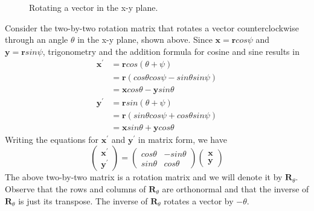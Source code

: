 \documentclass[oneside]{book}
\begin{document}
{{\begin{figure}[H]
\begin{center}
            \end{center}
            \caption{Rotating a vector in the x-y plane.}
        \end{figure}
        Consider the two-by-two rotation matrix that rotates a vector counterclockwise through an angle $\theta$ in the x-y plane, shown above. Since $\mathbf{x}=\mathbf{r}cos{\psi}$ and $\mathbf{y}=\mathbf{r}sin{\psi}$, trigonometry and the addition formula for cosine and sine results in
        \begin{align}
            \mathbf{x}^{'}&=\mathbf{r}cos({\theta}+{\psi})\\
                         &=\mathbf{r}(cos{\theta}cos{\psi}-sin{\theta}sin{\psi})\\
                         &=\mathbf{x}cos{\theta}-\mathbf{y}sin{\theta}
        \end{align}
        \begin{align}
            \mathbf{y}^{'}&=\mathbf{r}sin({\theta}+{\psi})\\
                         &=\mathbf{r}(sin{\theta}cos{\psi}+cos{\theta}sin{\psi})\\
                         &=\mathbf{x}sin{\theta}+\mathbf{y}cos{\theta}
        \end{align}
        Writing the equations for $\mathbf{x}^{'}$ and $\mathbf{y}^{'}$ in matrix form, we have
        $$\begin{pmatrix}
            \mathbf{x}^{'}\\
            \mathbf{y}^{'}
        \end{pmatrix}
        =
        \begin{pmatrix}
            cos{\theta} & -sin{\theta}\\
            sin{\theta} & cos{\theta}
        \end{pmatrix}
        \begin{pmatrix}
            \mathbf{x}\\
            \mathbf{y}
        \end{pmatrix}$$
        The above two-by-two matrix is a rotation matrix and we will denote it by $\mathbf{R}_{\theta}$. Observe that the rows and columns of $\mathbf{R}_{\theta}$ are orthonormal and that the inverse of $\mathbf{R}_{\theta}$ is just its transpose. The inverse of $\mathbf{R}_{\theta}$ rotates a vector by $-\theta$.
    }

}
\end{document}
